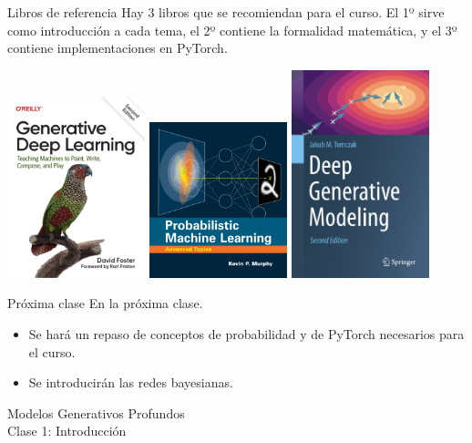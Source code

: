 \documentclass{beamer}
\begin{document}
\begin{frame}{Libros de referencia}
    Hay 3 libros que se recomiendan para el curso. El 1º sirve como introducción a cada tema, el 2º contiene la formalidad matemática, y el 3º contiene implementaciones en PyTorch.
    \vspace{0.3cm}
    \begin{center}
        \href{https://www.oreilly.com/library/view/generative-deep-learning/9781098134174/}{\includegraphics[width=0.3\textwidth]{foster.pdf}}
        \href{https://probml.github.io/pml-book/book2.html}{\includegraphics[width=0.3\textwidth]{murphy.pdf}}
        \href{https://link.springer.com/book/10.1007/978-3-031-64087-2}{\includegraphics[width=0.3\textwidth]{tomczak.pdf}}
    \end{center}
\end{frame}

\begin{frame}{Próxima clase}
    En la próxima clase.
    \begin{itemize}
        \item<2> Se hará un repaso de conceptos de probabilidad y de PyTorch necesarios para el curso.
        \item<3> Se introducirán las redes bayesianas.
    \end{itemize}
\end{frame}

\begin{frame}
    \centering
    \Large{Modelos Generativos Profundos}\\
    \large{Clase 1: Introducción}
\end{frame}
\end{document}
